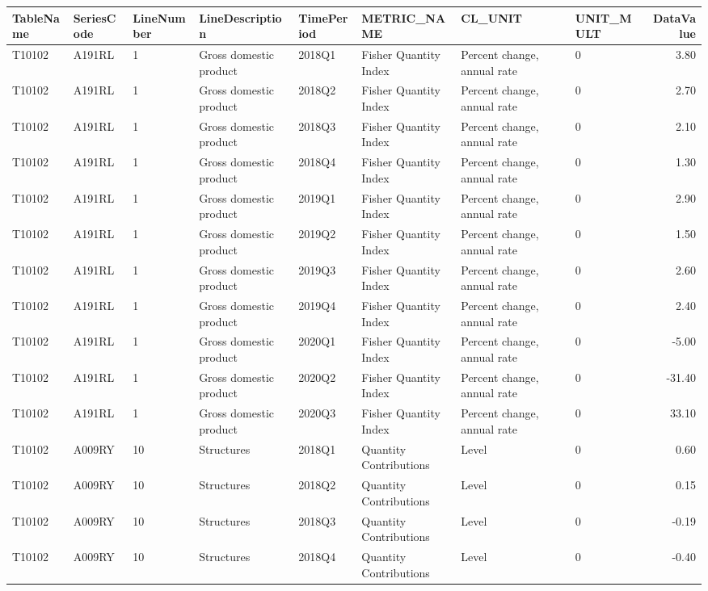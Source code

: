 \documentclass[
]{article}
\begin{document}
\begin{tabular}{l|l|l|l|l|l|l|l|r}
\hline
TableName & SeriesCode & LineNumber & LineDescription & TimePeriod & METRIC\_NAME & CL\_UNIT & UNIT\_MULT & DataValue\\
\hline
T10102 & A191RL & 1 & Gross domestic product & 2018Q1 & Fisher Quantity Index & Percent change, annual rate & 0 & 3.80\\
\hline
T10102 & A191RL & 1 & Gross domestic product & 2018Q2 & Fisher Quantity Index & Percent change, annual rate & 0 & 2.70\\
\hline
T10102 & A191RL & 1 & Gross domestic product & 2018Q3 & Fisher Quantity Index & Percent change, annual rate & 0 & 2.10\\
\hline
T10102 & A191RL & 1 & Gross domestic product & 2018Q4 & Fisher Quantity Index & Percent change, annual rate & 0 & 1.30\\
\hline
T10102 & A191RL & 1 & Gross domestic product & 2019Q1 & Fisher Quantity Index & Percent change, annual rate & 0 & 2.90\\
\hline
T10102 & A191RL & 1 & Gross domestic product & 2019Q2 & Fisher Quantity Index & Percent change, annual rate & 0 & 1.50\\
\hline
T10102 & A191RL & 1 & Gross domestic product & 2019Q3 & Fisher Quantity Index & Percent change, annual rate & 0 & 2.60\\
\hline
T10102 & A191RL & 1 & Gross domestic product & 2019Q4 & Fisher Quantity Index & Percent change, annual rate & 0 & 2.40\\
\hline
T10102 & A191RL & 1 & Gross domestic product & 2020Q1 & Fisher Quantity Index & Percent change, annual rate & 0 & -5.00\\
\hline
T10102 & A191RL & 1 & Gross domestic product & 2020Q2 & Fisher Quantity Index & Percent change, annual rate & 0 & -31.40\\
\hline
T10102 & A191RL & 1 & Gross domestic product & 2020Q3 & Fisher Quantity Index & Percent change, annual rate & 0 & 33.10\\
\hline
T10102 & A009RY & 10 & Structures & 2018Q1 & Quantity Contributions & Level & 0 & 0.60\\
\hline
T10102 & A009RY & 10 & Structures & 2018Q2 & Quantity Contributions & Level & 0 & 0.15\\
\hline
T10102 & A009RY & 10 & Structures & 2018Q3 & Quantity Contributions & Level & 0 & -0.19\\
\hline
T10102 & A009RY & 10 & Structures & 2018Q4 & Quantity Contributions & Level & 0 & -0.40\\

\end{tabular}
\end{document}
